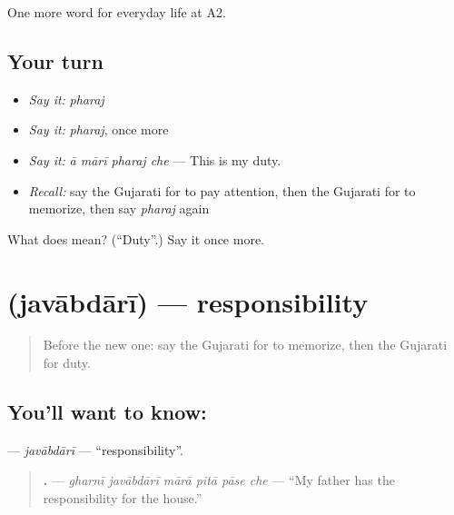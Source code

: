 \begin{grammarlens}[title={What you've built}]
One more word for everyday life at A2.
\end{grammarlens}

\subsection*{Your turn}
\begin{itemize}
\raggedright
  \item \emph{Say it:} \emph{pharaj}
  \item \emph{Say it:} \emph{pharaj}, once more
  \item \emph{Say it:} \emph{ā mārī pharaj che} — This is my duty.
  \item \emph{Recall:} say the Gujarati for to pay attention, then the Gujarati for to memorize, then say \emph{pharaj} again
\end{itemize}

\begin{tcolorbox}[breakable,colback=teal!4,colframe=teal!35!black,title={Before you move on}]
What does  mean? (\textquotedblleft{}Duty\textquotedblright{}.) Say it once more.
\end{tcolorbox}
\section[\texorpdfstring{\gu{જવાબદારી} (javābdārī)}{જવાબદારી (javābdārī)}]{ (javābdārī) — responsibility}

\label{lesson:GU-C252-javabdari}



\begin{quote}
Before the new one: say the Gujarati for to memorize, then the Gujarati for duty.
\end{quote}

\subsection*{You'll want to know: }
\textbf{} — \emph{javābdārī} — \textquotedblleft{}responsibility\textquotedblright{}.

\begin{quote}
\textbf{     .} — \emph{gharnī javābdārī mārā pitā pāse che} — \textquotedblleft{}My father has the responsibility for the house.\textquotedblright{}
\end{quote}

